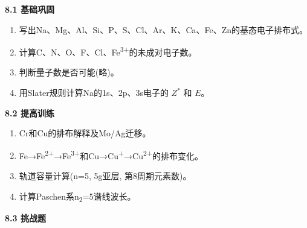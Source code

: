 \textbf{8.1 基础巩固}

\begin{enumerate}
\def\labelenumi{\arabic{enumi}.}
\tightlist
\item
  写出Na、Mg、Al、Si、P、S、Cl、Ar、K、Ca、Fe、Zn的基态电子排布式。
\item
  计算C、N、O、F、Cl、Fe\textsuperscript{3+}的未成对电子数。
\item
  判断量子数是否可能(略)。
\item
  用Slater规则计算Na的1s、2p、3s电子的 \(Z^*\) 和 \(E\)。
\end{enumerate}

\textbf{8.2 提高训练}

\begin{enumerate}
\def\labelenumi{\arabic{enumi}.}
\setcounter{enumi}{4}
\tightlist
\item
  Cr和Cu的排布解释及Mo/Ag迁移。
\item
  Fe→Fe\textsuperscript{2+}→Fe\textsuperscript{3+}和Cu→Cu\textsuperscript{+}→Cu\textsuperscript{2+}的排布变化。
\item
  轨道容量计算(n=5, 5g亚层, 第8周期元素数)。
\item
  计算Paschen系n\textsubscript{2}=5谱线波长。
\end{enumerate}

\textbf{8.3 挑战题}

